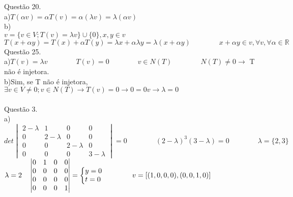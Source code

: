 \documentclass[12pt]{article}
\begin{document}
\noindent Questão 20.\\

\noindent a)\quad$T(\alpha v)=\alpha T(v)=\alpha(\lambda v)=\lambda(\alpha v)$\\

\noindent b)\\

$v=\lbrace v\in V;T(v)=\lambda v\rbrace\cup\lbrace0\rbrace,x,y\in v$\\

$T(x+\alpha y)=T(x)+\alpha T(y)=\lambda x+\alpha \lambda y=\lambda(x+\alpha y)\qquad\qquad x+\alpha y \in v,\forall v,\forall \alpha \in \mathds{R}$\\

\noindent Questão 25.\\

\noindent a)\quad$T(v)=\lambda v\qquad\qquad T(v)=0\qquad\qquad v\in N(T)\qquad\qquad N(T)\neq0\longrightarrow$ T não é injetora.\\

\noindent b)\quad Sim, se T não é injetora, $\exists v\in V\neq0;v\in N(T)\longrightarrow T(v)=0\longrightarrow0=0v\longrightarrow\lambda=0$\\

\\

\noindent Questão 3.\\

\noindent a)\\

$det\begin{vmatrix}2-\lambda&1&0&0\\0&2-\lambda&0&0\\0&0&2-\lambda&0\\0&0&0&3-\lambda\end{vmatrix}=0\qquad\qquad(2-\lambda)^{3}(3-\lambda)=0\qquad\qquad\lambda=\lbrace2,3\rbrace$\\

$\lambda=2\quad\begin{vmatrix}0&1&0&0\\0&0&0&0\\0&0&0&0\\0&0&0&1\end{vmatrix}=\left\{\begin{array}{@{}l@{}}y=0\\t=0\end{array}\right.\qquad\qquad v=[(1,0,0,0),(0,0,1,0)]$\\
\end{document}
